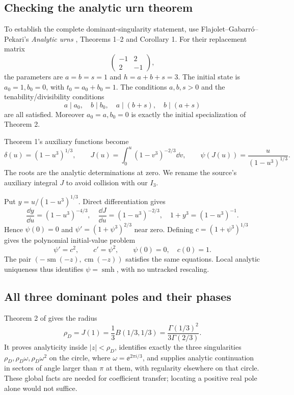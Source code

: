 \documentclass[11pt,letterpaper]{article}
\numberwithin{equation}{section}
\theoremstyle{remark}\newtheorem{remark}[theorem]{Remark}
\begin{document}
\subsection{Checking the analytic urn theorem}
To establish the complete dominant-singularity statement, use Flajolet--Gabarr\'o--Pekari's \emph{Analytic urns} \cite{urns}, Theorems 1--2 and Corollary 1. For their replacement matrix
\[
 \begin{pmatrix}-1&2\\2&-1\end{pmatrix},
\]
the parameters are $a=b=s=1$ and $h=a+b+s=3$. The initial state is $a_0=1,b_0=0$, with $t_0=a_0+b_0=1$. The conditions $a,b,s>0$ and the tenability/divisibility conditions
\[
 a\mid a_0,\quad b\mid b_0,\quad a\mid(b+s),\quad b\mid(a+s)
\]
are all satisfied. Moreover $a_0=a,b_0=0$ is exactly the initial specialization of Theorem 2.

Theorem 1's auxiliary functions become
\begin{equation}\label{pwd:hm:eq:urn-specialization}
 \delta(u)=(1-u^3)^{1/3},\qquad
 J(u)=\int_0^u(1-v^3)^{-2/3}\dd v,\qquad
 \psi(J(u))=\frac{u}{(1-u^3)^{1/3}}.
\end{equation}
The roots are the analytic determinations at zero. We rename the source's auxiliary integral $J$ to avoid collision with our $I_3$.

Put $y=u/(1-u^3)^{1/3}$. Direct differentiation gives
\[
 \frac{\dd y}{\dd u}=(1-u^3)^{-4/3},\quad
 \frac{\dd J}{\dd u}=(1-u^3)^{-2/3},\quad
 1+y^3=(1-u^3)^{-1}.
\]
Hence $\psi(0)=0$ and $\psi'=(1+\psi^3)^{2/3}$ near zero. Defining $c=(1+\psi^3)^{1/3}$ gives the polynomial initial-value problem
\[
 \psi'=c^2,\qquad c'=\psi^2,\qquad\psi(0)=0,\quad c(0)=1.
\]
The pair $(-\operatorname{sm}(-z),\operatorname{cm}(-z))$ satisfies the same equations. Local analytic uniqueness thus identifies $\psi=\operatorname{smh}$, with no untracked rescaling.

\subsection{All three dominant poles and their phases}
Theorem 2 of \cite{urns} gives the radius
\begin{equation}\label{pwd:hm:eq:rho-dixon}
 \rho_D=J(1)=\frac13B(1/3,1/3)
 =\frac{\Gamma(1/3)^2}{3\Gamma(2/3)}.
\end{equation}
It proves analyticity inside $|z|<\rho_D$, identifies exactly the three singularities
$\rho_D,\rho_D\omega,\rho_D\omega^2$ on the circle, where $\omega=\ee^{2\pi i/3}$, and supplies analytic continuation in sectors of angle larger than $\pi$ at them, with regularity elsewhere on that circle. These global facts are needed for coefficient transfer; locating a positive real pole alone would not suffice.
\end{document}
